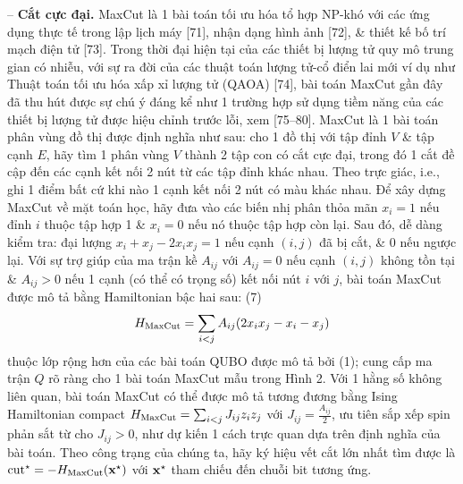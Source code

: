 \documentclass{article}
\begin{document}
\begin{itemize}
    -- {\bf Cắt cực đại.} MaxCut là 1 bài toán tối ưu hóa tổ hợp NP-khó với các ứng dụng thực tế trong lập lịch máy [71], nhận dạng hình ảnh [72], \& thiết kế bố trí mạch điện tử [73]. Trong thời đại hiện tại của các thiết bị lượng tử quy mô trung gian có nhiễu, với sự ra đời của các thuật toán lượng tử-cổ điển lai mới ví dụ như Thuật toán tối ưu hóa xấp xỉ lượng tử (QAOA) [74], bài toán MaxCut gần đây đã thu hút được sự chú ý đáng kể như 1 trường hợp sử dụng tiềm năng của các thiết bị lượng tử được hiệu chỉnh trước lỗi, xem [75--80]. MaxCut là 1 bài toán phân vùng đồ thị được định nghĩa như sau: cho 1 đồ thị với tập đỉnh $V$ \& tập cạnh $E$, hãy tìm 1 phân vùng $V$ thành 2 tập con có cắt cực đại, trong đó 1 cắt đề cập đến các cạnh kết nối 2 nút từ các tập đỉnh khác nhau. Theo trực giác, i.e., ghi 1 điểm bất cứ khi nào 1 cạnh kết nối 2 nút có màu khác nhau. Để xây dựng MaxCut về mặt toán học, hãy đưa vào các biến nhị phân thỏa mãn $x_i = 1$ nếu đỉnh $i$ thuộc tập hợp 1 \& $x_i = 0$ nếu nó thuộc tập hợp còn lại. Sau đó, dễ dàng kiểm tra: đại lượng $x_i + x_j - 2x_ix_j = 1$ nếu cạnh $(i,j)$ đã bị cắt, \& 0 nếu ngược lại. Với sự trợ giúp của ma trận kề $A_{ij}$ với $A_{ij} = 0$ nếu cạnh $(i,j)$ không tồn tại \& $A_{ij} > 0$ nếu 1 cạnh (có thể có trọng số) kết nối nút $i$ với $j$, bài toán MaxCut được mô tả bằng Hamiltonian bậc hai sau: (7)
    \begin{equation*}
        H_{\rm MaxCut} = \sum_{i < j} A_{ij}(2x_ix_j - x_i - x_j)
    \end{equation*}
    thuộc lớp rộng hơn của các bài toán QUBO được mô tả bởi (1); cung cấp ma trận $Q$ rõ ràng cho 1 bài toán MaxCut mẫu trong {\sf Hình 2}. Với 1 hằng số không liên quan, bài toán MaxCut có thể được mô tả tương đương bằng Ising Hamiltonian compact $H_{\rm MaxCut} = \sum_{i < j} J_{ij}z_iz_j$ với $J_{ij} = \frac{A_{ij}}{2}$, ưu tiên sắp xếp spin phản sắt từ cho $J_{ij} > 0$, như dự kiến 1 cách trực quan dựa trên định nghĩa của bài toán. Theo công trạng của chúng ta, hãy ký hiệu vết cắt lớn nhất tìm được là ${\rm cut}^\star = -H_{\rm MaxCut}({\bf x}^\star)$ với ${\bf x}^\star$ tham chiếu đến chuỗi bit tương ứng.


\end{itemize}
\end{document}
